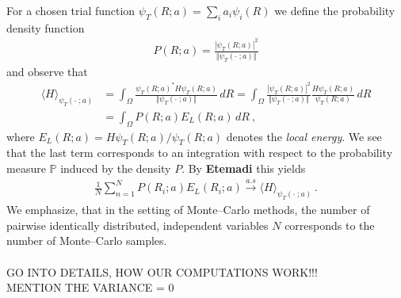 \documentclass[11pt,a4paper]{article}
\numberwithin{equation}{section}
\begin{document}
For a chosen trial function $\psi_T(R;a)=\sum_{i}a_i\psi_i(R)$ we define the probability density function 
\begin{align*}
P(R;a) = \frac{|\psi_T(R;a)|^2}{\Vert \psi_T(\cdot\;;a)\Vert}
\end{align*} 
and observe that 
\begin{align*}
\langle H \rangle_{\psi_T(\cdot\;;a)} 
&= \int_{\Omega}\frac{\psi_T(R;a)^*H\psi_T(R;a)}{\Vert \psi_T(\cdot\;;a)\Vert}\,dR
=\int_{\Omega} \frac{|\psi_T(R;a)|^2}{\Vert \psi_T(\cdot\;;a)\Vert}\frac{H\psi_T(R;a)}{\psi_T(R;a)}\,dR\\
&=\int_{\Omega} P(R;a)E_L(R;a)\,dR~,
\end{align*}
where $E_L(R;a) = H\psi_T(R;a)/\psi_T(R;a)$ denotes the {\it local energy}. 
%
We see that the last term corresponds to an integration with respect to the probability measure $\mathbb{P}$ induced by the density $P$.
%
By \textbf{Etemadi} this yields
\begin{align*}
\label{eq:StrongLawofBN}
\frac{1}{N}\sum_{n=1}^NP(R_i;a)E_L(R_i;a)\overset{a.s}{\longrightarrow}\langle H \rangle_{\psi_T(\cdot\;;a)}~.
\end{align*}
We emphasize, that in the setting of Monte--Carlo methods, the number of pairwise identically distributed, independent variables $N$ corresponds to the number of  Monte--Carlo samples.\\
\\
GO INTO DETAILS, HOW OUR COMPUTATIONS WORK!!!\\
MENTION THE VARIANCE = 0\\
\\
\end{document}
